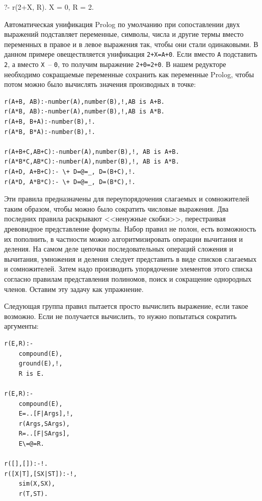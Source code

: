\documentclass[a4paper,14pt, openany, twoside, final]{extbook} %
\begin{document}
\begin{proexp}
?- r(2+X, R).
X = 0,
R = 2.
\end{proexp}

Автоматическая унификация Prolog по умолчанию при сопоставлении двух выражений подставляет переменные, символы, числа и другие термы вместо переменных в правое и в левое выражения так, чтобы они стали одинаковыми.  В данном примере овеществляется унификация \texttt{2+X=A+0}.  Если вместо \texttt{A} подставить \texttt{2}, а вместо \texttt{X}~-- \texttt{0}, то получим выражение \texttt{2+0=2+0}.  В нашем редукторе необходимо сокращаемые переменные сохранить как переменные \foreignlanguage{english}{Prolog}, чтобы потом можно было вычислять значения производных в точке:

\begin{verbatim}
r(A+B, AB):-number(A),number(B),!,AB is A+B.
r(A*B, AB):-number(A),number(B),!,AB is A*B.
r(A+B, B+A):-number(B),!.
r(A*B, B*A):-number(B),!.

r(A+B+C,AB+C):-number(A),number(B),!, AB is A+B.
r(A*B*C,AB*C):-number(A),number(B),!, AB is A*B.
r(A+D, A+B+C):- \+ D=@=_, D=(B+C),!.
r(A*D, A*B*C):- \+ D=@=_, D=(B*C),!.
\end{verbatim}

Эти правила предназначены для переупорядочения слагаемых и сомножителей таким образом, чтобы можно было сократить числовые выражения.  Два последних правила раскрывают <<ненужные скобки>>, перестраивая древовидное представление формулы.  Набор правил не полон, есть возможность их пополнить, в частности можно алгоритмизировать операции вычитания и деления.  На самом деле цепочки последовательных операций сложения и вычитания, умножения и деления следует представить в виде списков слагаемых и сомножителей.  Затем надо производить упорядочение элементов этого списка согласно правилам представления полиномов, поиск и сокращение однородных членов.  Оставим эту задачу как упражнение.

Следующая группа правил пытается просто вычислить выражение, если такое возможно.  Если не получается вычислить, то нужно попытаться сократить аргументы:\enlargethispage{-2em}

\begin{verbatim}
r(E,R):-
    compound(E),
    ground(E),!,
    R is E.

r(E,R):-
    compound(E),
    E=..[F|Args],!,
    r(Args,SArgs),
    R=..[F|SArgs],
    E\=@=R.

r([],[]):-!.
r([X|T],[SX|ST]):-!,
    sim(X,SX),
    r(T,ST).
\end{verbatim}
\end{document}
